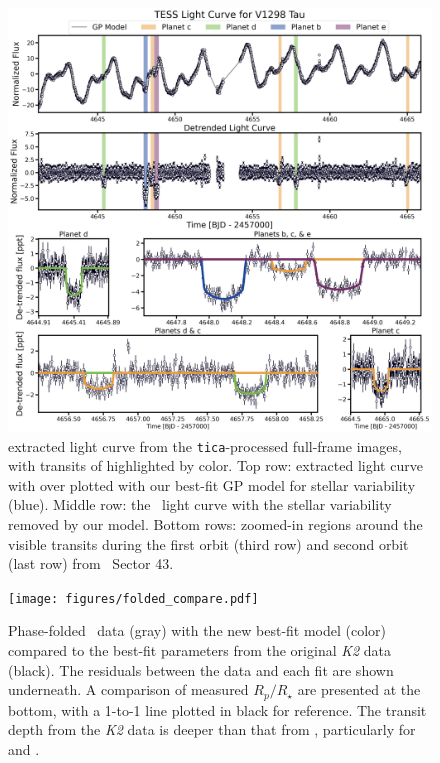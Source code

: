 \documentclass[twocolumn]{aastex631}
\begin{document}
\begin{figure}[!ht]
\begin{center}
\includegraphics[width=\textwidth,trim={0.25cm 0 0 0}]{figures/lightcurve.pdf}
\caption{\sname extracted light curve from the \texttt{tica}-processed full-frame images, with transits of \allplanets highlighted by color. Top row: extracted light curve with over plotted with our best-fit GP model for stellar variability (blue). Middle row: the \tess\ light curve with the stellar variability removed by our model. Bottom rows: zoomed-in regions around the visible transits during the first orbit (third row) and second orbit (last row) from \tess\ Sector 43.} 
\label{fig:transits}
\end{center}
\end{figure}


\begin{figure}[!ht]
\begin{center}
\texttt{[image: figures/folded\_compare.pdf]}
\caption{Phase-folded \tess\ data (gray) with the new best-fit model (color) compared to the best-fit parameters from the original \textit{K2} data (black). The residuals between the data and each fit are shown underneath. A comparison of measured $R_p/R_\star$ are presented at the bottom, with a 1-to-1 line plotted in black for reference. The transit depth from the \textit{K2} data is deeper than that from \tess, particularly for \planetb and \planete. }
  \label{fig:compare}
\end{center}
\end{figure}
\end{document}
